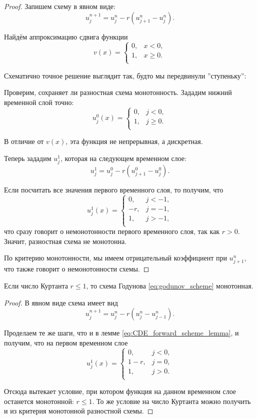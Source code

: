 \documentclass[../main.tex]{subfile}
\begin{document}
\begin{proof}\label{eq:CDE_forward_scheme_lemma}
	Запишем схему в явном виде:
	\[u_j^{n+1}=u_j^n-r(u_{j+1}^n-u_j^n).\]

	Найдём аппроксимацию сдвига функции
	\[v(x)=
		\begin{cases}
			0, & x<0, \\
			1, & x\ge 0. \\
		\end{cases}
	\]

	Схематично точное решение выглядит так, будто мы передвинули
	''ступеньку'':

	

	Проверим, сохраняет ли разностная схема монотонность. Зададим нижний
	временной слой точно:
	\[u_j^0(x)=
		\begin{cases}
			0, & j<0, \\
			1, & j\ge 0. \\
		\end{cases}
	\]

	В отличие от $v(x)$, эта функция не непрерывная, а дискретная.

	Теперь зададим $u_j^1$, которая на следующем временном слое:
	\[u_j^1=u_j^0-r(u_{j+1}^0-u_j^0).\]

	Если посчитать все значения первого временного слоя, то получим, что
	\[u_j^1(x)=
		\begin{cases}
			0, & j<-1, \\
			-r,& j=-1, \\
			1, & j>-1, \\
		\end{cases}
	\]
	что сразу говорит о немонотонности первого временного слоя, так как
	$r>0$. Значит, разностная схема не монотонна.

	По критерию монотонности, мы имеем отрицательный коэффициент при
	$u_{j+1}^n$, что также говорит о немонотонности схемы.
\end{proof}

\begin{theorem}
	Если число Куртанта $r\le 1$, то схема Годунова
	\eqref{eq:godunov_scheme} монотонная.
\end{theorem}

\begin{proof}
	В явном виде схема имеет вид
	\[u_j^{n+1}=u_j^n-r(u_j^n-u_{j-1}^n).\]

	Проделаем те же шаги, что и в лемме \eqref{eq:CDE_forward_scheme_lemma},
	и получим, что на первом временном слое
	\[u_j^1(x)=
		\begin{cases}
			0,   & j<0, \\
			1-r, & j=0, \\
			1,   & j>0. \\
		\end{cases}
	\]

	Отсюда вытекает условие, при котором функция на данном временном слое
	останется монотонной: $r\le 1$. То же условие на число Куртанта можно
	получить и из критерия монотонной разностной схемы.
\end{proof}
\end{document}
